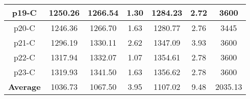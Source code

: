 \begin{table*}[h!]
\begin{minipage}{0.7\columnwidth}
{\begin{tabular}{@{}ccccccc@{}}
			\midrule
			p19-C & 1250.26 & 1266.54 & 1.30 & 1284.23 & 2.72 & 3600 \\
			\midrule
			p20-C & 1246.36 & 1266.70 & 1.63 & 1280.77 & 2.76 & 3445 \\
			\midrule
			p21-C & 1296.19 & 1330.11 & 2.62 & 1347.09 & 3.93 & 3600 \\
			\midrule
			p22-C & 1317.94 & 1332.07 & 1.07 & 1354.61 & 2.78 & 3600 \\
			\midrule
			p23-C & 1319.93 & 1341.50 & 1.63 & 1356.62 & 2.78 & 3600 \\
			\midrule
			\textbf{Average} & 1036.73 & 1067.50 & 3.95 & 1107.02 & 9.48 & 2035.13 \\ \bottomrule
		\end{tabular}%
	}
	\label{tab:table2}
\end{minipage}
\end{table*}